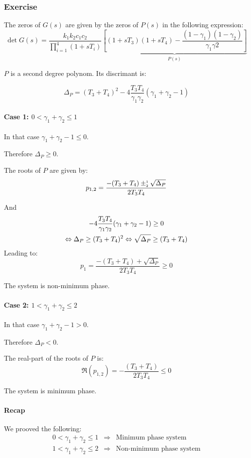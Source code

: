 \subsubsection{Exercise}

The zeros of $G(s)$ are given by the zeros of $P(s)$ in the following expression:
$$
\det G(s) = \frac{k_1k_2c_1c_2}{\prod_{i=1}^{4} (1 + s T_i)}
\underbrace{\left[ (1+sT_3)(1+sT_4) - \frac{(1-\gamma_1)(1 - \gamma_2)}{\gamma_1\gamma2}\right]}_{P(s)}
$$

$P$ is a second degree polynom. Its discrimant is:

$$
\Delta_P = (T_3+T_4)^2 - 4\frac{T_3T_4}{\gamma_1\gamma_2}(\gamma_1+\gamma_2-1) 
$$

\paragraph{Case 1: $0 < \gamma_1 + \gamma_2 \leq 1$}
In that case $\gamma_1 + \gamma_2 - 1 \leq 0$. 

Therefore
$\Delta_P \geq 0$.

The roots of $P$ are given by:
$$
p_{1,2} = \frac{-(T_3+T_4) \pm_\text{\tiny{2}}^\text{\tiny{1}} \sqrt{\Delta_P}}{2T_3T_4}
$$

And 
\begin{multline*}
    -4\frac{T_3T_4}{\gamma_1\gamma_2}(\gamma_1+\gamma_2-1) \geq 0 \\ \Leftrightarrow \Delta_P \geq (T_3+T_4)^2 \Leftrightarrow \sqrt{\Delta_P}\geq (T_3+T_4)$$
\end{multline*}
Leading to:
$$
p_1 = \frac{-(T_3+T_4) + \sqrt{\Delta_P}}{2T_3T_4} \geq 0
$$

The system is non-minimum phase.


\paragraph{Case 2: $1 < \gamma_1 + \gamma_2 \leq 2$}
In that case $\gamma_1+\gamma_2 -1 > 0$.

Therefore
$\Delta_P < 0$.

The real-part of the roots of $P$ is:
$$
\Re(p_{1,2}) = -\frac{(T_3+T_4)}{2T_3T_4} \leq 0
$$

The system is minimum phase.

\paragraph{Recap}

We prooved the following:
$$
\begin{array}{rcl}
    0 < \gamma_1 + \gamma_2 \leq 1 & \Rightarrow & \text{Minimum phase system} \\
    1 < \gamma_1 + \gamma_2 \leq 2 & \Rightarrow & \text{Non-minimum phase system} \\
\end{array}
$$
